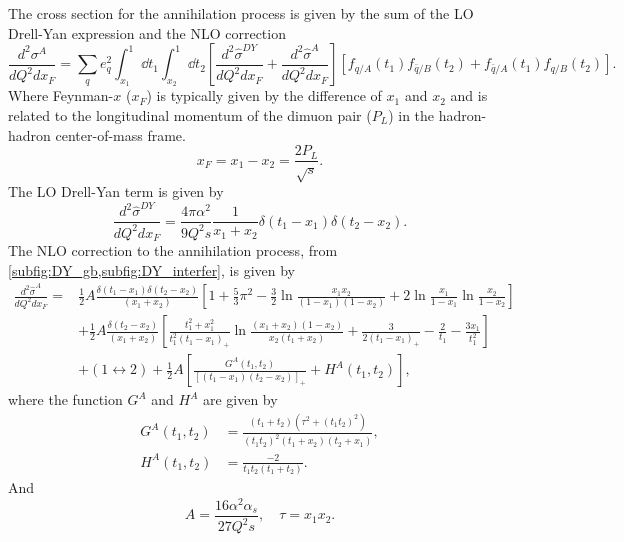 The cross section for the annihilation process is given by the sum of the LO Drell-Yan expression and
the NLO correction~\cite{kubar1980}
\begin{equation}
	\frac{d^2\sigma^A}{dQ^2dx_{F}} = \sum_q e^2_q \int^1_{x_1} \dd{t_1} \int^1_{x_2} \dd{t_2}
	\left[ \frac{d^2\hat{\sigma}^{DY}}{dQ^2dx_F}+\frac{d^2\hat{\sigma}^{A}}{dQ^2dx_F} \right]
	\left[f_{q/A}\left(t_1\right)f_{\bar{q}/B}\left(t_2\right) +
	f_{\bar{q}/A}\left(t_1\right)f_{q/B}\left(t_2\right)
	\right].
\end{equation}
Where Feynman-$x$ ($x_F$) is typically given by the difference of $x_1$ and $x_2$ and is related to the
longitudinal momentum of the dimuon pair ($P_L$) in the hadron-hadron center-of-mass frame.
\begin{equation}
	x_F = x_1 - x_2 = \frac{2P_L}{\sqrt{s}}.
\end{equation}
The LO Drell-Yan term is given by
\begin{equation}
	\frac{ d^2\hat{\sigma}^{DY} }{dQ^2 dx_F} = \frac{4\pi\alpha^2}{9Q^2 s} \frac{1}{x_1+x_2}\delta\left(t_1-x_1\right)\delta\left(t_2-x_2\right).
\end{equation}
The NLO correction to the annihilation process, from \cref{subfig:DY_gb,subfig:DY_interfer},
is given by
\begin{equation}
\begin{split}
	\frac{d^2\hat{\sigma}^{A}}{dQ^2dx_F} =& \frac{1}{2}A \frac{\delta\left(t_1-x_1\right)\delta\left(t_2-x_2\right)}{\left(x_1+x_2\right)} \left[ 1+\frac{5}{3}\pi^2 - \frac{3}{2}\ln\frac{x_1x_2}{\left(1-x_1\right)\left(1-x_2\right)} + 2\ln\frac{x_1}{1-x_1}\ln\frac{x_2}{1-x_2}\right]\\
	&+\frac{1}{2} A \frac{\delta\left(t_2-x_2\right)}{\left(x_1+x_2\right)}\left[\frac{t_1^2+x_1^2}{t_1^2\left(t_1-x_1\right)_{+}} \ln\frac{\left(x_1+x_2\right)\left(1-x_2\right)}{x_2\left(t_1+x_2\right)} + \frac{3}{2\left(t_1-x_1\right)_{+}} -\frac{2}{t_1} - \frac{3x_1}{t_1^2}\right]\\
	&+\left(1\leftrightarrow 2\right) + \frac{1}{2} A \left[\frac{G^A\left(t_1,t_2\right)}{\left[\left(t_1-x_1\right)\left(t_2-x_2\right)\right]_{+}} +H^A\left(t_1,t_2\right)\right],
\end{split}
\end{equation}
where the function $G^A$ and $H^A$ are given by
\begin{align}
	G^A\left(t_1,t_2\right) &= \frac{\left(t_1+t_2\right)\left(\tau^2+\left(t_1t_2\right)^2\right)}{\left(t_1t_2\right)^2\left(t_1+x_2\right)\left(t_2+x_1\right)},\\
	H^A\left(t_1,t_2\right) &= \frac{-2}{t_1t_2\left(t_1+t_2\right)}.
\end{align}
And
\begin{equation}
	A=\frac{16\alpha^2\alpha_s}{27Q^2s}, \quad \tau=x_1x_2.
\end{equation}

